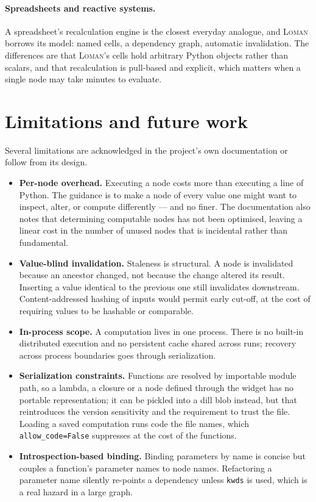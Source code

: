 \documentclass[11pt,a4paper]{article}
\newcommand{\loman}{\textsc{Loman}}
\newcommand{\code}[1]{\texttt{#1}}
\begin{document}
\paragraph{Spreadsheets and reactive systems.} A spreadsheet's recalculation
engine is the closest everyday analogue, and \loman{} borrows its model:
named cells, a dependency graph, automatic invalidation. The differences are
that \loman{}'s cells hold arbitrary Python objects rather than scalars, and
that recalculation is pull-based and explicit, which matters when a single node
may take minutes to evaluate.

\section{Limitations and future work}\label{sec:limits}

Several limitations are acknowledged in the project's own documentation or
follow from its design.

\begin{itemize}
  \item \textbf{Per-node overhead.} Executing a node costs more than executing
  a line of Python. The guidance is to make a node of every value one might
  want to inspect, alter, or compute differently --- and no finer. The
  documentation also notes that determining computable nodes has not been
  optimised, leaving a linear cost in the number of unused nodes that is
  incidental rather than fundamental.

  \item \textbf{Value-blind invalidation.} Staleness is structural. A node is
  invalidated because an ancestor changed, not because the change altered its
  result. Inserting a value identical to the previous one still invalidates
  downstream. Content-addressed hashing of inputs would permit early cut-off,
  at the cost of requiring values to be hashable or comparable.

  \item \textbf{In-process scope.} A computation lives in one process. There
  is no built-in distributed execution and no persistent cache shared across
  runs; recovery across process boundaries goes through serialization.

  \item \textbf{Serialization constraints.} Functions are resolved by
  importable module path, so a lambda, a closure or a node defined through the
  widget has no portable representation; it can be pickled into a dill blob
  instead, but that reintroduces the version sensitivity and the requirement to
  trust the file. Loading a saved computation runs code the file names, which
  \code{allow\_code=False} suppresses at the cost of the functions.

  \item \textbf{Introspection-based binding.} Binding parameters by name is
  concise but couples a function's parameter names to node names. Refactoring
  a parameter name silently re-points a dependency unless \code{kwds} is used,
  which is a real hazard in a large graph.
\end{itemize}
\end{document}
